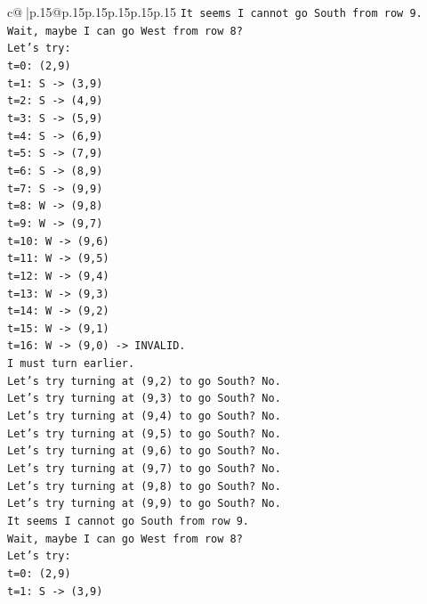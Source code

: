 \documentclass{article}
\begin{document}
{\begin{supertabular}{c@{$\;$}|p{.15\linewidth}@{}p{.15\linewidth}p{.15\linewidth}p{.15\linewidth}p{.15\linewidth}p{.15\linewidth}}
{{{\texttt{It seems I cannot go South from row 9.} \\
\texttt{Wait, maybe I can go West from row 8?} \\
\texttt{Let's try:} \\
\texttt{t=0: (2,9)} \\
\texttt{t=1: S {-}> (3,9)} \\
\texttt{t=2: S {-}> (4,9)} \\
\texttt{t=3: S {-}> (5,9)} \\
\texttt{t=4: S {-}> (6,9)} \\
\texttt{t=5: S {-}> (7,9)} \\
\texttt{t=6: S {-}> (8,9)} \\
\texttt{t=7: S {-}> (9,9)} \\
\texttt{t=8: W {-}> (9,8)} \\
\texttt{t=9: W {-}> (9,7)} \\
\texttt{t=10: W {-}> (9,6)} \\
\texttt{t=11: W {-}> (9,5)} \\
\texttt{t=12: W {-}> (9,4)} \\
\texttt{t=13: W {-}> (9,3)} \\
\texttt{t=14: W {-}> (9,2)} \\
\texttt{t=15: W {-}> (9,1)} \\
\texttt{t=16: W {-}> (9,0) {-}> INVALID.} \\
\texttt{I must turn earlier.} \\
\texttt{Let's try turning at (9,2) to go South? No.} \\
\texttt{Let's try turning at (9,3) to go South? No.} \\
\texttt{Let's try turning at (9,4) to go South? No.} \\
\texttt{Let's try turning at (9,5) to go South? No.} \\
\texttt{Let's try turning at (9,6) to go South? No.} \\
\texttt{Let's try turning at (9,7) to go South? No.} \\
\texttt{Let's try turning at (9,8) to go South? No.} \\
\texttt{Let's try turning at (9,9) to go South? No.} \\
\texttt{It seems I cannot go South from row 9.} \\
\texttt{Wait, maybe I can go West from row 8?} \\
\texttt{Let's try:} \\
\texttt{t=0: (2,9)} \\
\texttt{t=1: S {-}> (3,9)} \\
}}}
\end{supertabular}}
\end{document}
